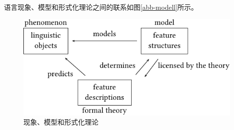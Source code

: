 语言现象、模型和形式化理论之间的联系如图\vref{abb-modell}所示。
\begin{figure}
\centerline{%
\includegraphics{Figures/model-theory-phenomenon-crop}
}
\caption{\label{abb-modell}现象、模型和形式化理论}
\end{figure}%
